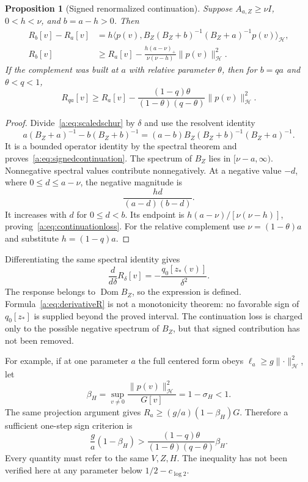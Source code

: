 \documentclass[11pt,a4paper]{article}
\numberwithin{equation}{section}
\newtheorem{proposition}[theorem]{Proposition}
\theoremstyle{definition}\newtheorem{definition}[theorem]{Definition}
\theoremstyle{remark}\newtheorem{remark}[theorem]{Remark}
\newcommand{\Hh}{\mathcal H}\newcommand{\Hw}{\mathcal H}
\newcommand{\dom}{\operatorname{Dom}}\newcommand{\Var}{\operatorname{Var}}
\newcommand{\ip}[2]{\langle#1,#2\rangle}\newcommand{\norm}[1]{\lVert#1\rVert}\newcommand{\abs}[1]{\lvert#1\rvert}
\begin{document}
\begin{proposition}[Signed renormalized continuation]\label{a:prop:continuation}
Suppose $A_{a,Z}\ge\nu I$, $0<h<\nu$, and $b=a-h>0$. Then
\begin{align}
 R_b[v]-R_a[v]
 &=h\ip{p(v)}{B_Z(B_Z+b)^{-1}(B_Z+a)^{-1}p(v)}_{\Hh},
                  \label{a:eq:signedcontinuation}\\
 R_b[v]&\ge R_a[v]
 -\frac{h(a-\nu)_+}{\nu(\nu-h)}\norm{p(v)}_{\Hh}^2.
                  \label{a:eq:continuationloss}
\end{align}
If the complement was built at $a$ with relative parameter $\theta$, then for $b=qa$ and $\theta<q<1$,
\begin{equation}\label{a:eq:ratio_loss}
 R_{qa}[v]\ge R_a[v]
 -\frac{(1-q)\theta}{(1-\theta)(q-\theta)}\norm{p(v)}_{\Hh}^2.
\end{equation}
\end{proposition}
\begin{proof}
Divide~\eqref{a:eq:scaledschur} by $\delta$ and use the resolvent identity
\[
 a(B_Z+a)^{-1}-b(B_Z+b)^{-1}
 =(a-b)B_Z(B_Z+b)^{-1}(B_Z+a)^{-1}.
\]
It is a bounded operator identity by the spectral theorem and proves~\eqref{a:eq:signedcontinuation}. The spectrum of $B_Z$ lies in $[\nu-a,\infty)$. Nonnegative spectral values contribute nonnegatively. At a negative value $-d$, where $0\le d\le a-\nu$, the negative magnitude is
\[
 \frac{hd}{(a-d)(b-d)}.
\]
It increases with $d$ for $0\le d<b$. Its endpoint is
$h(a-\nu)/[\nu(\nu-h)]$, proving~\eqref{a:eq:continuationloss}. For the relative complement use $\nu=(1-\theta)a$ and substitute $h=(1-q)a$.
\end{proof}

Differentiating the same spectral identity gives
\begin{equation}\label{a:eq:derivativeR}
 \frac{d}{d\delta}R_\delta[v]
 =-\frac{q_0[z_*(v)]}{\delta^2}.
\end{equation}
The response belongs to $\dom B_Z$, so the expression is defined. Formula~\eqref{a:eq:derivativeR} is not a monotonicity theorem: no favorable sign of $q_0[z_*]$ is supplied beyond the proved interval. The continuation loss is charged only to the possible negative spectrum of $B_Z$, but that signed contribution has not been removed.

For example, if at one parameter $a$ the full centered form obeys
$\ell_a\ge g\norm{\cdot}_{\Hh}^2$, let
\begin{equation}\label{a:eq:beta}
 \beta_H=\sup_{v\ne0}\frac{\norm{p(v)}_{\Hh}^2}{G[v]}=1-\sigma_H<1.
\end{equation}
The same projection argument gives
$R_a\ge(g/a)(1-\beta_H)G$. Therefore a sufficient one-step sign criterion is
\begin{equation}\label{a:eq:onestep}
 \frac ga(1-\beta_H)
 >\frac{(1-q)\theta}{(1-\theta)(q-\theta)}\beta_H.
\end{equation}
Every quantity must refer to the same $V,Z,H$. The inequality has not been verified here at any parameter below $1/2-c_{\log2}$.
\end{document}
